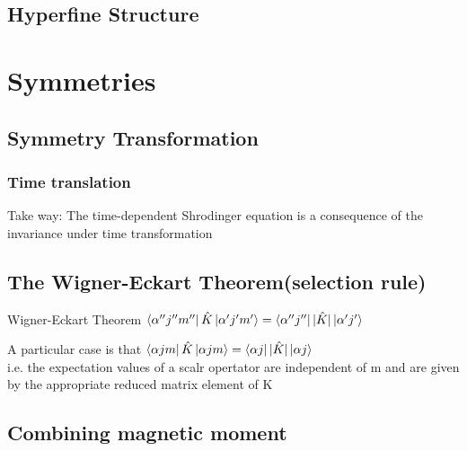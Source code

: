 \documentclass[12pt,a4paper]{article}
\begin{document}
\subsection{Hyperfine Structure}
\section{Symmetries}

\subsection{Symmetry Transformation}
\subsubsection{Time translation}
Take way: The time-dependent Shrodinger equation is a consequence of the invariance under time transformation
\subsection{The Wigner-Eckart Theorem(selection rule)}
\begin{theorem}
    {Wigner-Eckart Theorem}
    {$ \bra {\alpha'' j''m''}\hat{K}\ket{\alpha' j'm'} = \bra{\alpha''j''}|\hat{K}|\ket{\alpha'j'}$}
\end{theorem}
A particular case is that $ \bra {\alpha jm}\hat{K}\ket{\alpha jm} = \bra{\alpha j}|\hat{K}|\ket{\alpha j}$\\
i.e. the expectation values of a scalr opertator are independent of m and are given by the appropriate reduced matrix element of K
\subsection{Combining magnetic moment}
\end{document}
